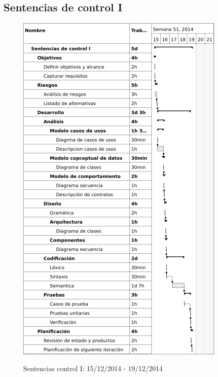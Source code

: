 \subsection{Sentencias de control I}
\begin{center}
\begin{figure}[H]
\centering
\includegraphics[scale=1]{planning/7-sentencias-control-i.png} \\
\caption{Sentencias control I: 15/12/2014 - 19/12/2014 }
\end{figure}
\end{center}

